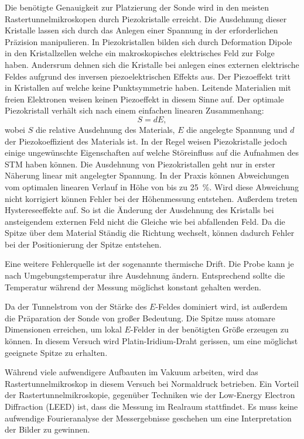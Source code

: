 Die benötigte Genauigkeit zur Platzierung der Sonde wird in den meisten Rastertunnelmikroskopen durch Piezokristalle erreicht.
Die Ausdehnung dieser Kristalle lassen sich durch das Anlegen einer Spannung in der erforderlichen Präzision manipulieren.
In Piezokristallen bilden sich durch Deformation Dipole in den Kristallzellen welche ein makroskopisches elektrisches Feld zur Folge haben.
Andersrum dehnen sich die Kristalle bei anlegen eines externen elektrische Feldes aufgrund des inversen piezoelektrischen Effekts aus.
Der Piezoeffekt tritt in Kristallen auf welche keine Punktsymmetrie haben. Leitende Materialien mit freien Elektronen weisen keinen
Piezoeffekt in diesem Sinne auf.
Der optimale Piezokristall verhält sich nach einem einfachen linearen Zusammenhang:
\begin{equation}
  S = d E,
\end{equation}
wobei $S$ die relative Ausdehnung des Materials, $E$ die angelegte Spannung und $d$ der Piezokoeffizient des Materials ist.
In der Regel weisen Piezokristalle jedoch einige ungewünschte Eigenschaften auf welche Störeinfluss auf die Aufnahmen des STM haben können.
Die Ausdehnung von Piezokristallen geht nur in erster Näherung linear mit angelegter Spannung. In der Praxis können
Abweichungen vom optimalen linearen Verlauf in Höhe von bis zu \SI{25}{\percent}\cite[2.2.1]{lueth}.
Wird diese Abweichung nicht korrigiert können Fehler bei der Höhenmessung entstehen.
Außerdem treten Hystereseeffekte auf. So ist die Änderung der Ausdehnung des Kristalls bei ansteigendem externen Feld nicht die Gleiche wie bei
abfallenden Feld. Da die Spitze über dem Material Ständig die Richtung wechselt, können dadurch Fehler bei der Positionierung der Spitze entstehen.


Eine weitere Fehlerquelle ist der sogenannte thermische Drift. Die Probe kann je nach Umgebungstemperatur ihre Ausdehnung ändern. Entsprechend sollte
die Temperatur während der Messung möglichst konstant gehalten werden.

Da der Tunnelstrom von der Stärke des $E$-Feldes dominiert wird,
ist außerdem die Präparation der Sonde von großer Bedeutung.
Die Spitze muss atomare Dimensionen erreichen, um lokal $E$-Felder in der benötigten Größe erzeugen zu können.
In diesem Versuch wird Platin-Iridium-Draht gerissen, um eine möglichst geeignete Spitze zu erhalten.

Während viele aufwendigere Aufbauten im Vakuum arbeiten, wird das Rastertunnelmikroskop in diesem Versuch bei Normaldruck betrieben.
Ein Vorteil der Rastertunnelmikroskopie, gegenüber Techniken wie der Low-Energy Electron Diffraction (LEED) ist, dass die Messung im Realraum stattfindet.
Es muss keine aufwendige Fourieranalyse der Messergebnisse geschehen um eine Interpretation der Bilder zu gewinnen.


